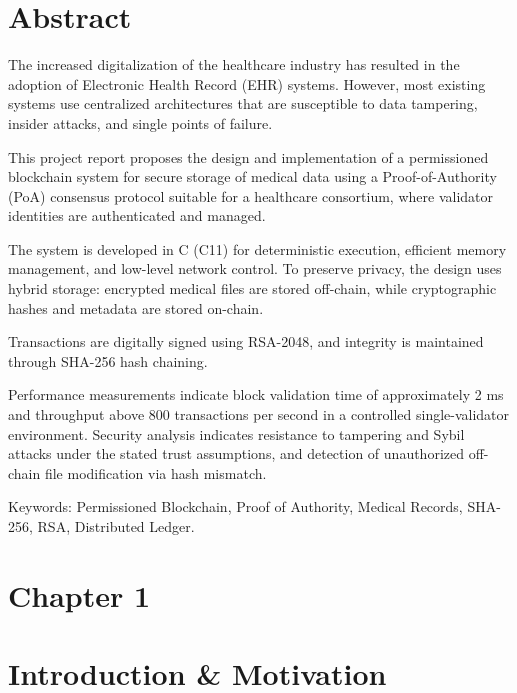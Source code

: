 \section*{Abstract}
\label{sec:abstract}
The increased digitalization of the healthcare industry has resulted in the adoption of Electronic Health Record (EHR) systems. However, most existing systems use centralized architectures that are susceptible to data tampering, insider attacks, and single points of failure.

This project report proposes the design and implementation of a permissioned blockchain system for secure storage of medical data using a Proof-of-Authority (PoA) consensus protocol suitable for a healthcare consortium, where validator identities are authenticated and managed.

The system is developed in C (C11) for deterministic execution, efficient memory management, and low-level network control. To preserve privacy, the design uses hybrid storage: encrypted medical files are stored off-chain, while cryptographic hashes and metadata are stored on-chain.

Transactions are digitally signed using RSA-2048, and integrity is maintained through SHA-256 hash chaining.

Performance measurements indicate block validation time of approximately 2 ms and throughput above 800 transactions per second in a controlled single-validator environment. Security analysis indicates resistance to tampering and Sybil attacks under the stated trust assumptions, and detection of unauthorized off-chain file modification via hash mismatch.

Keywords: Permissioned Blockchain, Proof of Authority, Medical Records, SHA-256, RSA, Distributed Ledger.

\newpage

\section*{Chapter 1}
\label{ch:1}

\section*{Introduction \& Motivation}

